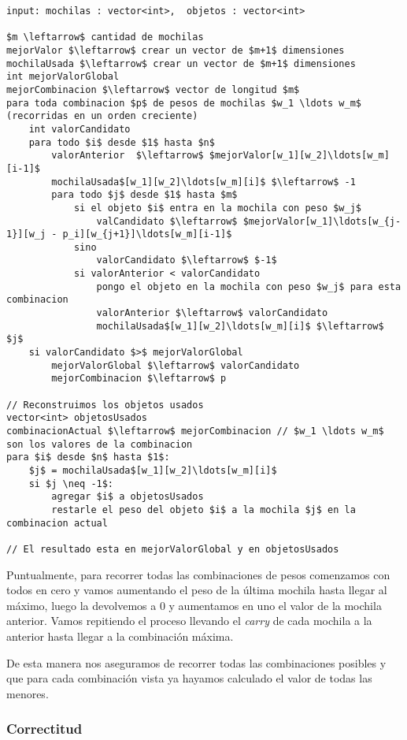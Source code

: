 \begin{lstlisting}
input: mochilas : vector<int>,  objetos : vector<int>

$m \leftarrow$ cantidad de mochilas
mejorValor $\leftarrow$ crear un vector de $m+1$ dimensiones
mochilaUsada $\leftarrow$ crear un vector de $m+1$ dimensiones
int mejorValorGlobal
mejorCombinacion $\leftarrow$ vector de longitud $m$
para toda combinacion $p$ de pesos de mochilas $w_1 \ldots w_m$ (recorridas en un orden creciente)
	int valorCandidato
	para todo $i$ desde $1$ hasta $n$
		valorAnterior  $\leftarrow$ $mejorValor[w_1][w_2]\ldots[w_m][i-1]$
		mochilaUsada$[w_1][w_2]\ldots[w_m][i]$ $\leftarrow$ -1
		para todo $j$ desde $1$ hasta $m$
			si el objeto $i$ entra en la mochila con peso $w_j$
				valCandidato $\leftarrow$ $mejorValor[w_1]\ldots[w_{j-1}][w_j - p_i][w_{j+1}]\ldots[w_m][i-1]$
			sino
				valorCandidato $\leftarrow$ $-1$
			si valorAnterior < valorCandidato
				pongo el objeto en la mochila con peso $w_j$ para esta combinacion
				valorAnterior $\leftarrow$ valorCandidato
				mochilaUsada$[w_1][w_2]\ldots[w_m][i]$ $\leftarrow$ $j$
	si valorCandidato $>$ mejorValorGlobal
		mejorValorGlobal $\leftarrow$ valorCandidato
		mejorCombinacion $\leftarrow$ p

// Reconstruimos los objetos usados
vector<int> objetosUsados
combinacionActual $\leftarrow$ mejorCombinacion // $w_1 \ldots w_m$ son los valores de la combinacion
para $i$ desde $n$ hasta $1$:
    $j$ = mochilaUsada$[w_1][w_2]\ldots[w_m][i]$
    si $j \neq -1$:
        agregar $i$ a objetosUsados
        restarle el peso del objeto $i$ a la mochila $j$ en la combinacion actual

// El resultado esta en mejorValorGlobal y en objetosUsados
\end{lstlisting}

Puntualmente, para recorrer todas las combinaciones de pesos comenzamos con todos en cero y vamos aumentando el peso de la última mochila hasta llegar al máximo, luego la devolvemos a 0 y aumentamos en uno el valor de la mochila anterior. Vamos repitiendo el proceso llevando el \textit{carry} de cada mochila a la anterior hasta llegar a la combinación máxima.

De esta manera nos aseguramos de recorrer todas las combinaciones posibles y que para cada combinación vista ya hayamos calculado el valor de todas las menores.

\subsubsection{Correctitud}

